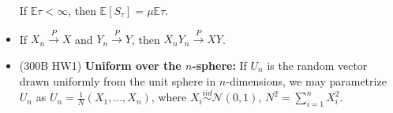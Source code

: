 \documentclass[twoside]{article}
\newcommand{\dis}{\displaystyle}
\newcommand\bbE{\mathbb{E}}
\newcommand\calN{\mathcal{N}}
\newcommand\goesto{\rightarrow}
\begin{document}
\begin{itemize}
If $\bbE \tau < \infty$, then $\bbE [S_\tau] = \mu \bbE \tau$.

\item If $X_n \stackrel{P}{\goesto} X$ and $Y_n \stackrel{P}{\goesto} Y$, then $X_nY_n \stackrel{P}{\goesto} XY$.

\item (300B HW1) \textbf{Uniform over the $n$-sphere:} If $U_n$ is the random vector drawn uniformly from the unit sphere in $n$-dimensions, we may parametrize $U_n$ as $U_n = \dis\frac{1}{N}(X_1, \dots, X_n)$, where $X_i \stackrel{iid}{\sim} \calN(0,1)$, $N^2 = \dis\sum_{i=1}^n X_i^2$. 

\end{itemize}
\end{document}
